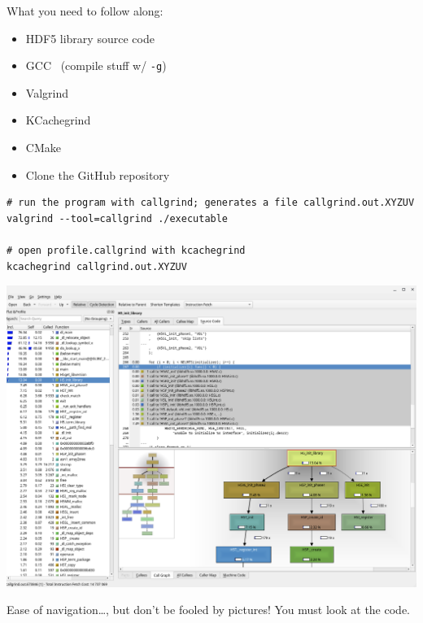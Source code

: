
What you need to follow along:

\begin{itemize}
    \item HDF5 library source code~\cite{libhdf52023}
    \item GCC~\cite{gcc2023} (compile stuff w/ \texttt{-g})
    \item Valgrind~\cite{valgrind2023}
    \item KCachegrind~\cite{kcachegrind2023}
    \item CMake~\cite{cmake2023}
    \item Clone the GitHub repository~\cite{hdf5-tourist}
\end{itemize}

\begin{verbatim}
# run the program with callgrind; generates a file callgrind.out.XYZUV
valgrind --tool=callgrind ./executable

# open profile.callgrind with kcachegrind
kcachegrind callgrind.out.XYZUV
\end{verbatim}

\includegraphics[scale=0.3]{images/kcachegrind.png}

Ease of navigation\ldots, but don't be fooled by pictures! You must look at the code.

